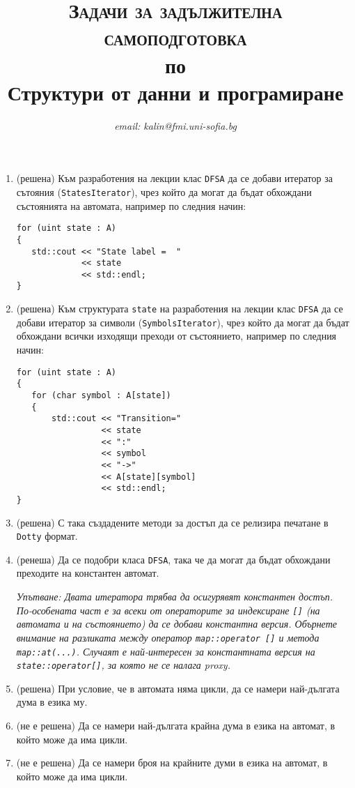 \documentclass[12pt,a4paper]{article}
\author{\textit{email: kalin@fmi.uni-sofia.bg}}
\title{\textsc{Задачи за задължителна самоподготовка} \\
по \\
Структури от данни и програмиране}
\begin{document}
\maketitle



\begin{enumerate}


	\item (решена) Към разработения на лекции клас \texttt{DFSA} да се добави итератор за сътояния (\texttt{StatesIterator}), чрез който да могат да бъдат обхождани състоянията на автомата, например по следния начин:

\begin{verbatim}
for (uint state : A)
{
   std::cout << "State label =  "
             << state
             << std::endl;
}
\end{verbatim}


\item (решена) Към структурата \texttt{state} на разработения на лекции клас \texttt{DFSA} да се добави итератор за символи (\texttt{SymbolsIterator}), чрез който да могат да бъдат обхождани всички изходящи преходи от състоянието, например по следния начин:

\begin{verbatim}
for (uint state : A)
{
   for (char symbol : A[state])
   {
       std::cout << "Transition="
                 << state
                 << ":"
                 << symbol
                 << "->"
                 << A[state][symbol]
                 << std::endl;
}
\end{verbatim}

\item (решена) С така създадените методи за достъп да се релизира печатане в \texttt{Dotty} формат.

\item (ренеша) Да се подобри класа \texttt{DFSA}, така че да могат да бъдат обхождани преходите на константен автомат.

\emph{Упътване: Двата итератора трябва да осигурявят константен достъп. По-особената част е за всеки от операторите за индексиране \texttt{[]} (на автомата и на състоянието) да се добави константна версия. Обърнете внимание на разликата между оператор \texttt{map::operator []} и метода \texttt{map::at(...)}. Случаят е най-интересен за константната версия на \texttt{state::operator[]}, за която не се налага proxy.}

\item (решена) При условие, че в автомата няма цикли, да се намери най-дългата дума в езика му.

\item (не е решена) Да се намери най-дългата крайна дума в езика на автомат, в който може да има цикли.

\item (не е решена) Да се намери броя на крайните думи в езика на автомат, в който може да има цикли.


\end{enumerate}
\end{document}
